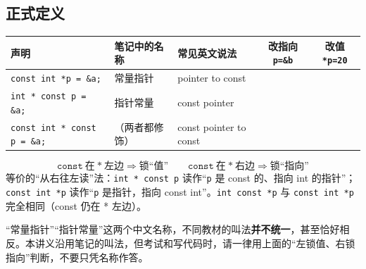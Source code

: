 \documentclass[UTF8,a4paper,11pt,fontset=none,zihao=-4]{ctexart}
\renewcommand{\arraystretch}{1.12}
\newcommand{\cmark}{\textcolor{okc}{\ding{51}}}
\newcommand{\xmark}{\textcolor{badc}{\ding{55}}}
\newcommand{\cc}[1]{\texttt{#1}}
\begin{document}
\subsection{正式定义}
\begin{definitionbox}
\renewcommand{\arraystretch}{1.25}
\noindent\begin{tabularx}{\linewidth}{@{}p{3.6cm}p{2.3cm}p{2.9cm}cc@{}}
\toprule
声明 & 笔记中的名称 & 常见英文说法 & 改指向 \cc{p=\&b} & 改值 \cc{*p=20} \\
\midrule
\cc{const int *p = \&a;} & 常量指针 & pointer to const & \cmark & \xmark \\
\cc{int * const p = \&a;} & 指针常量 & const pointer & \xmark & \cmark \\
\cc{const int * const p = \&a;} & （两者都修饰） & const pointer to const & \xmark & \xmark \\
\bottomrule
\end{tabularx}
\end{definitionbox}

\begin{formulabox}
\[
\boxed{\ \texttt{const}\ \text{在}\ \texttt{*}\ \text{左边} \Rightarrow \text{锁“值”}\qquad
\texttt{const}\ \text{在}\ \texttt{*}\ \text{右边} \Rightarrow \text{锁“指向”}\ }
\]
{\small 等价的“从右往左读”法：\cc{int * const p} 读作“\cc{p} 是 const 的、指向 int 的指针”；\cc{const int *p} 读作“\cc{p} 是指针，指向 const int”。\cc{int const *p} 与 \cc{const int *p} 完全相同（const 仍在 * 左边）。}
\end{formulabox}

\begin{warningbox}
“常量指针”“指针常量”这两个中文名称，不同教材的叫法\textbf{并不统一}，甚至恰好相反。本讲义沿用笔记的叫法，但考试和写代码时，请一律用上面的“左锁值、右锁指向”判断，不要只凭名称作答。
\end{warningbox}
\end{document}
